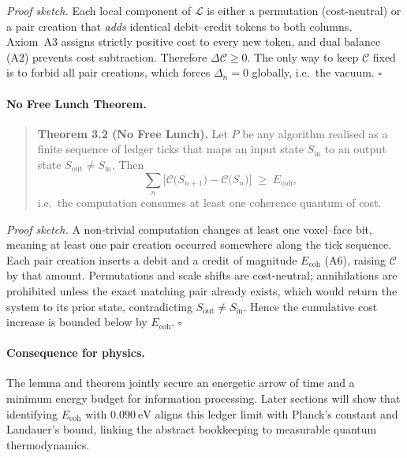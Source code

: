 \documentclass[11pt]{article}
\begin{document}
\emph{Proof sketch.}  
Each local component of \(\mathcal{L}\) is either a permutation
(cost-neutral) or a pair creation that \emph{adds} identical debit–credit
tokens to both columns.  Axiom~A3 assigns strictly positive cost to every
new token, and dual balance (A2) prevents cost subtraction.  Therefore
\(\Delta\mathcal{C} \ge 0\).  The only way to keep \(\mathcal{C}\) fixed
is to forbid all pair creations, which forces \(\Delta_{n}=0\) globally,
i.e.\ the vacuum.  \(\square\)

\bigskip
\paragraph{No Free Lunch Theorem.}
\begin{quote}
\textbf{Theorem 3.2 (No Free Lunch).}  
Let \(P\) be any algorithm realised as a finite sequence of ledger ticks
that maps an input state \(S_{\text{in}}\) to an output state
\(S_{\text{out}}\neq S_{\text{in}}\).  Then
\[
\sum_{n} \bigl[\mathcal{C}\!\bigl(S_{n+1}\bigr)
              -\mathcal{C}\!\bigl(S_{n}\bigr)\bigr]
\;\ge\;
 E_{\text{coh}},
\]
i.e.\ the computation consumes at least one coherence quantum of cost.
\end{quote}

\emph{Proof sketch.}  
A non-trivial computation changes at least one voxel–face bit, meaning at
least one pair creation occurred somewhere along the tick sequence.
Each pair creation inserts a debit and a credit of magnitude
\(E_{\text{coh}}\) (A6), raising \(\mathcal{C}\) by that amount.
Permutations and scale shifts are cost-neutral; annihilations are
prohibited unless the exact matching pair already exists, which would
return the system to its prior state, contradicting
\(S_{\text{out}}\neq S_{\text{in}}\).  Hence the cumulative cost increase
is bounded below by \(E_{\text{coh}}\).  \(\square\)

\paragraph{Consequence for physics.}
The lem\-ma and theorem jointly secure an energetic arrow of time and a
minimum energy budget for information processing.  Later sections will
show that identifying \(E_{\text{coh}}\) with \(0.090~\mathrm{eV}\)
aligns this ledger limit with Planck’s constant and Landauer’s bound,
linking the abstract bookkeeping to measurable quantum thermodynamics.
\end{document}
